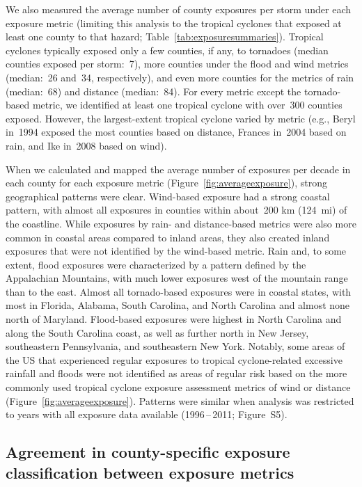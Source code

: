 We also measured the average number of county exposures per storm under each
exposure metric (limiting this analysis to the tropical cyclones that exposed
at least one county to that hazard; Table~\ref{tab:exposuresummaries}).
Tropical cyclones typically exposed only a few counties, if any, to tornadoes
(median counties exposed per storm:~7), more counties under the flood and wind
metrics (median:~26 and~34, respectively), and even more counties for the
metrics of rain (median:~68) and distance (median:~84).  For every metric
except the tornado-based metric, we identified at least one tropical cyclone
with over~300 counties exposed.  However, the largest-extent tropical cyclone
varied by metric (e.g., Beryl in~1994 exposed the most counties based on
distance, Frances in~2004 based on rain, and Ike in~2008 based on wind).

When we calculated and mapped the average number of exposures per decade in
each county for each exposure metric (Figure~\ref{fig:averageexposure}), strong
geographical patterns were clear. Wind-based exposure had a strong coastal
pattern, with almost all exposures in counties within about~200
\si{\kilo\metre} (124~mi) of the coastline. While exposures by rain- and
distance-based metrics were also more common in coastal areas compared to
inland areas, they also created inland exposures that were not identified by
the wind-based metric. Rain and, to some extent, flood exposures were
characterized by a pattern defined by the Appalachian Mountains, with much
lower exposures west of the mountain range than to the east. Almost all
tornado-based exposures were in coastal states, with most in Florida, Alabama,
South Carolina, and North Carolina and almost none north of Maryland.
Flood-based exposures were highest in North Carolina and along the South
Carolina coast, as well as further north in New Jersey, southeastern
Pennsylvania, and southeastern New York. Notably, some areas of the \ac{US}
that experienced regular exposures to tropical cyclone-related excessive
rainfall and floods were not identified as areas of regular risk based on the
more commonly used tropical cyclone exposure assessment metrics of wind or
distance (Figure~\ref{fig:averageexposure}). Patterns were similar when
analysis was restricted to years with all exposure data available
(1996\,--\,2011; Figure~S5). 

\subsection*{Agreement in county-specific exposure classification between exposure metrics}

